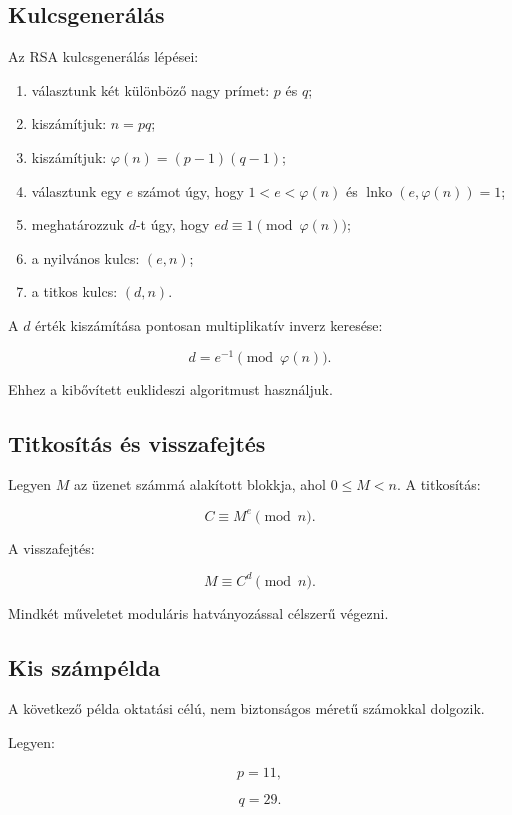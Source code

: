 

\subsection{Kulcsgenerálás}

Az RSA kulcsgenerálás lépései:

\begin{enumerate}
  \item választunk két különböző nagy prímet: $p$ és $q$;
  \item kiszámítjuk: $n=pq$;
  \item kiszámítjuk: $\varphi(n)=(p-1)(q-1)$;
  \item választunk egy $e$ számot úgy, hogy $1<e<\varphi(n)$ és $\operatorname{lnko}(e,\varphi(n))=1$;
  \item meghatározzuk $d$-t úgy, hogy $ed\equiv1\pmod{\varphi(n)}$;
  \item a nyilvános kulcs: $(e,n)$;
  \item a titkos kulcs: $(d,n)$.
\end{enumerate}

A $d$ érték kiszámítása pontosan multiplikatív inverz keresése:

\[
d=e^{-1}\pmod{\varphi(n)}.
\]

Ehhez a kibővített euklideszi algoritmust használjuk.

\subsection{Titkosítás és visszafejtés}

Legyen $M$ az üzenet számmá alakított blokkja, ahol $0\leq M<n$. A titkosítás:

\[
C\equiv M^e\pmod n.
\]

A visszafejtés:

\[
M\equiv C^d\pmod n.
\]

Mindkét műveletet moduláris hatványozással célszerű végezni.

\subsection{Kis számpélda}

A következő példa oktatási célú, nem biztonságos méretű számokkal dolgozik.

Legyen:

\[
p=11,
\]

\[
q=29.
\]

